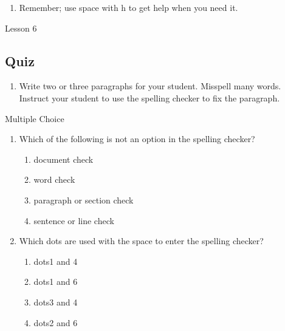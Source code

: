 \documentclass[10pt,letterpaper,twoside]{report}
\begin{document}
{{{{\begin{enumerate}
	\item Remember; use space with h to get help when you need it.
\end{enumerate}





\clearpage

\newpage
Lesson 6

\subsection{Quiz}



\begin{enumerate}
	\item Write two or three paragraphs for your student.  Misspell many words.  Instruct your student to use the spelling checker to fix the paragraph.
\end{enumerate}

Multiple Choice

\begin{enumerate}
	\item Which of the following is not an option in the spelling checker?
	      
	      \begin{enumerate}
		      \item document check
		            
		      \item word check
		            
		      \item paragraph or section check
		            
		      \item sentence or line check
		            
		            
	      \end{enumerate}
	\item Which dots are used with the space to enter the spelling checker?
	      
	      \begin{enumerate}
		      \item dots1 and 4
		            
		      \item dots1 and 6
		            
		      \item dots3 and 4
		            
		      \item dots2 and 6
		            

\end{enumerate}
\end{enumerate}}}}}
\end{document}
